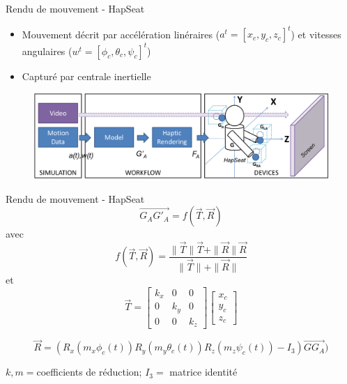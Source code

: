 {
\begin{frame}{Rendu de mouvement - HapSeat}
\begin{itemize}
\item Mouvement décrit par accélération linéraires ($a^t = [x_c,y_c,z_c]^t$) et vitesses angulaires ($w^t = [\phi_c, \theta_c, \psi_c]^t$)
\item Capturé par centrale inertielle
\end{itemize}
\begin{figure}
\centering
\includegraphics[width=\linewidth]{images/workflow}
\end{figure}
\end{frame}
}

\begin{frame}{Rendu de mouvement - HapSeat}
 \begin{equation}
 \overrightarrow{G_AG'_A} = f(\vec{T},\vec{R})
 \end{equation}
 avec
 \begin{equation}
f(\vec{T},\vec{R}) = \frac{\|\vec{T}\|\vec{T} + \|\vec{R}\|\vec{R}}{\|\vec{T}\| + \|\vec{R}\|}
\end{equation}
et
\begin{equation}
\vec{T} = \begin{bmatrix}
k_x & 0 & 0 \\
0 & k_y & 0 \\
0 & 0 & k_z
\end{bmatrix}
\begin{bmatrix}
x_c\\
y_c\\
z_c
\end{bmatrix} 
\label{eq:T}
\end{equation}
 

\begin{equation}
\vec{R} = (R_x(m_x \phi_c(t)) R_y(m_y \theta_c(t)) R_z(m_z \psi_c(t)) - I_3)\overrightarrow{GG_A})
\end{equation}

$k,m =$coefficients de réduction; $I_3 =$ matrice identité

\end{frame}

